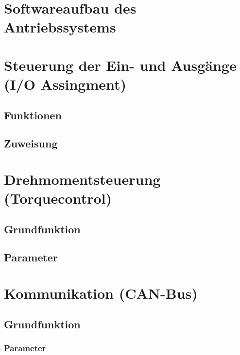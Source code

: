 \newpage



\section{Softwareaufbau des Antriebssystems}


\section{ Steuerung der Ein- und Ausgänge (I/O Assingment)}
\subsection{Funktionen}
\subsection{Zuweisung}


\section{Drehmomentsteuerung (Torquecontrol)}
\subsection{Grundfunktion}
\subsection{Parameter}


\section{Kommunikation (CAN-Bus)}
\subsection{Grundfunktion}
\subsubsection{Parameter}
